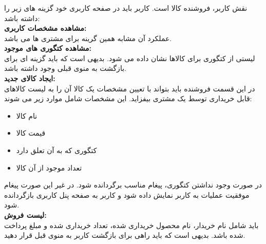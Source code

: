 \documentclass{article}
\begin{document}
    \subsubsection{}
    نقش کاربر، فروشنده کالا است. کاربر باید در صفحه کاربری 
    خود گزینه های زیر را داشته باشد:
    \vspace{0.5cm}
    \\ \textbf{مشاهده مشخصات کاربری:} \\    
        عملکرد آن مشابه همین گرینه برای مشتری ها می باشد.
    \vspace{0.5cm}
    \\ \textbf{مشاهده کتگوری های موجود:} \\
    لیستی از کتگوری برای کالاها نشان داده می شود. بدیهی
    است که باید گزینه ای برای بازگشت به منوی قبلی وجود داشته 
    باشد.   
    \vspace{0.5cm}
    \\ \textbf{ایجاد کالای جدید:} \\
    در این قسمت فروشنده باید بتواند با تعیین مشخصات یک کالا آن را به
    لیست کالاهای قابل خریداری توسط یک مشتری بیفزاید. این
    مشخصات شامل موارد زیر می شوند:
    \begin{itemize}[label=\textcolor{celestialblue}{\textbullet}]
        \item نام کالا
        \item قیمت کالا
        \item کتگوری که به آن تعلق دارد
        \item تعداد موجود از آن کالا
    \end{itemize}
    در صورت وجود نداشتن کتگوری، پیغام مناسب برگردانده شود.
    در غیر این صورت پیغام موفقیت عملیات به کاربر نمایش 
    داده شود و کاربر به صفحه پنل کاربری بازگردانده شود.
    \vspace{0.5cm}
    \\ \textbf{لیست فروش:} \\
    باید شامل نام خریدار، نام محصول خریداری شده، تعداد 
    خریداری شده و مبلغ پرداخت شده باشد.
    بدیهی است که باید  راهی برای بازگشت کاربر به منوی 
    قبل قرار دهید.
\end{document}
